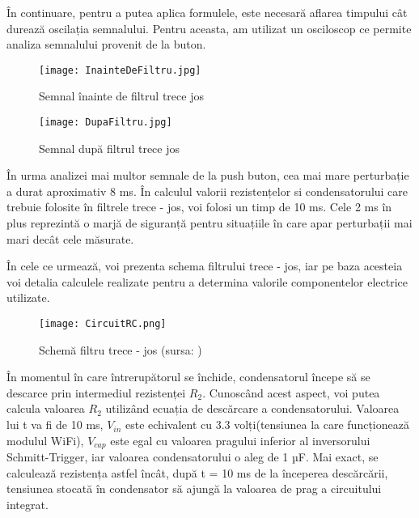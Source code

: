 \vspace{1em}
	În continuare, pentru a putea aplica formulele, este necesară aflarea timpului cât durează oscilația semnalului. Pentru aceasta, am utilizat un osciloscop ce permite analiza semnalului provenit de la buton.

\begin{figure}[H]
	\centering
    	\texttt{[image: InainteDeFiltru.jpg]}
	\caption{Semnal înainte de filtrul trece jos}
	\label{fig:InainteDeFiltru}
\end{figure}

\begin{figure}[H]
   	\centering
    	\texttt{[image: DupaFiltru.jpg]}
	\caption{Semnal după filtrul trece jos}
	\label{fig:DupaFiltru}
\end{figure}
	
	În urma analizei mai multor semnale de la push buton, cea mai mare perturbație a durat aproximativ 8 ms. În calculul valorii rezistențelor si condensatorului care trebuie folosite în filtrele trece - jos, voi folosi un timp de 10 ms. Cele 2 ms în plus reprezintă o marjă de siguranță pentru situațiile în care apar perturbații mai mari decât cele măsurate. 

\vspace{1em}

	În cele ce urmează, voi prezenta schema filtrului trece - jos, iar pe baza acesteia voi detalia calculele realizate pentru a determina valorile componentelor electrice utilizate.

\begin{figure}[H]
   	\centering
    	\texttt{[image: CircuitRC.png]}
	\caption{Schemă filtru trece - jos (sursa: \cite{buttonDebouncing})}
\end{figure}

	În momentul în care întrerupătorul se închide, condensatorul începe să se descarce prin intermediul rezistenței $R_2$. Cunoscând acest aspect, voi putea calcula valoarea $R_2$ utilizând ecuația de descărcare a condensatorului. Valoarea lui t va fi de 10 ms, $V_{in}$ este echivalent cu 3.3 volți(tensiunea la care funcționează modulul WiFi), $V_{cap}$ este egal cu valoarea pragului inferior al inversorului Schmitt-Trigger, iar valoarea condensatorului o aleg de 1 µF. Mai exact, se calculează rezistența astfel încât, după t = 10 ms de la începerea descărcării, tensiunea stocată în condensator să ajungă la valoarea de prag a circuitului integrat.

